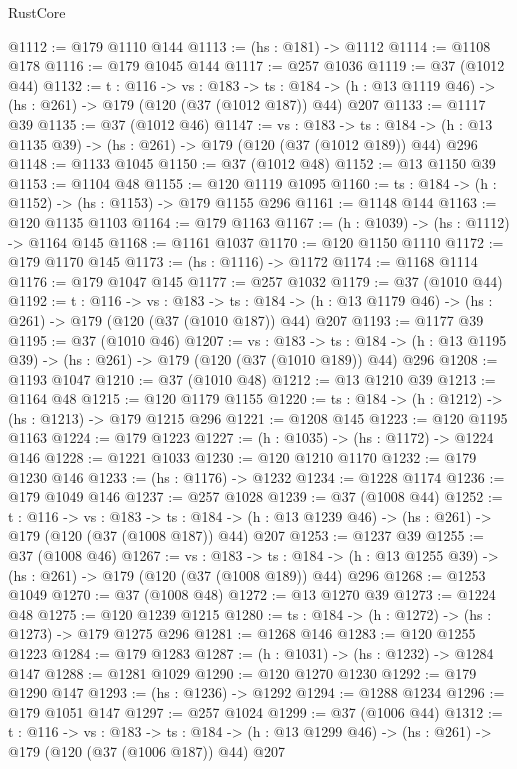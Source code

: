 \begin{lexlean}{RustCore}
\begin{coremodule}
@1112 := @179 @1110 @144
@1113 := (hs : @181) -> @1112
@1114 := @1108 @178
@1116 := @179 @1045 @144
@1117 := @257 @1036
@1119 := @37 (@1012 @44)
@1132 := {t : @116} ->
  {vs : @183} ->
  {ts : @184} -> (h : @13 @1119 @46) -> (hs : @261) -> @179 (@120 (@37 (@1012 @187)) @44) @207
@1133 := @1117 @39
@1135 := @37 (@1012 @46)
@1147 := {vs : @183} ->
  {ts : @184} -> (h : @13 @1135 @39) -> (hs : @261) -> @179 (@120 (@37 (@1012 @189)) @44) @296
@1148 := @1133 @1045
@1150 := @37 (@1012 @48)
@1152 := @13 @1150 @39
@1153 := @1104 @48
@1155 := @120 @1119 @1095
@1160 := {ts : @184} -> (h : @1152) -> (hs : @1153) -> @179 @1155 @296
@1161 := @1148 @144
@1163 := @120 @1135 @1103
@1164 := @179 @1163
@1167 := (h : @1039) -> (hs : @1112) -> @1164 @145
@1168 := @1161 @1037
@1170 := @120 @1150 @1110
@1172 := @179 @1170 @145
@1173 := (hs : @1116) -> @1172
@1174 := @1168 @1114
@1176 := @179 @1047 @145
@1177 := @257 @1032
@1179 := @37 (@1010 @44)
@1192 := {t : @116} ->
  {vs : @183} ->
  {ts : @184} -> (h : @13 @1179 @46) -> (hs : @261) -> @179 (@120 (@37 (@1010 @187)) @44) @207
@1193 := @1177 @39
@1195 := @37 (@1010 @46)
@1207 := {vs : @183} ->
  {ts : @184} -> (h : @13 @1195 @39) -> (hs : @261) -> @179 (@120 (@37 (@1010 @189)) @44) @296
@1208 := @1193 @1047
@1210 := @37 (@1010 @48)
@1212 := @13 @1210 @39
@1213 := @1164 @48
@1215 := @120 @1179 @1155
@1220 := {ts : @184} -> (h : @1212) -> (hs : @1213) -> @179 @1215 @296
@1221 := @1208 @145
@1223 := @120 @1195 @1163
@1224 := @179 @1223
@1227 := (h : @1035) -> (hs : @1172) -> @1224 @146
@1228 := @1221 @1033
@1230 := @120 @1210 @1170
@1232 := @179 @1230 @146
@1233 := (hs : @1176) -> @1232
@1234 := @1228 @1174
@1236 := @179 @1049 @146
@1237 := @257 @1028
@1239 := @37 (@1008 @44)
@1252 := {t : @116} ->
  {vs : @183} ->
  {ts : @184} -> (h : @13 @1239 @46) -> (hs : @261) -> @179 (@120 (@37 (@1008 @187)) @44) @207
@1253 := @1237 @39
@1255 := @37 (@1008 @46)
@1267 := {vs : @183} ->
  {ts : @184} -> (h : @13 @1255 @39) -> (hs : @261) -> @179 (@120 (@37 (@1008 @189)) @44) @296
@1268 := @1253 @1049
@1270 := @37 (@1008 @48)
@1272 := @13 @1270 @39
@1273 := @1224 @48
@1275 := @120 @1239 @1215
@1280 := {ts : @184} -> (h : @1272) -> (hs : @1273) -> @179 @1275 @296
@1281 := @1268 @146
@1283 := @120 @1255 @1223
@1284 := @179 @1283
@1287 := (h : @1031) -> (hs : @1232) -> @1284 @147
@1288 := @1281 @1029
@1290 := @120 @1270 @1230
@1292 := @179 @1290 @147
@1293 := (hs : @1236) -> @1292
@1294 := @1288 @1234
@1296 := @179 @1051 @147
@1297 := @257 @1024
@1299 := @37 (@1006 @44)
@1312 := {t : @116} ->
  {vs : @183} ->
  {ts : @184} -> (h : @13 @1299 @46) -> (hs : @261) -> @179 (@120 (@37 (@1006 @187)) @44) @207

\end{coremodule}
\end{lexlean}
